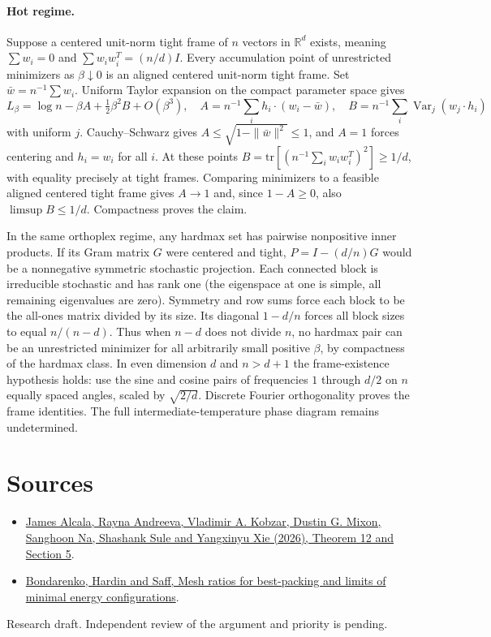 \documentclass[10pt]{article}
\begin{document}
\paragraph{Hot regime.} Suppose a centered unit-norm tight frame of $n$ vectors in $\mathbb R^d$ exists, meaning $\sum w_i=0$ and $\sum w_iw_i^T=(n/d)I$. Every accumulation point of unrestricted minimizers as $\beta\downarrow0$ is an aligned centered unit-norm tight frame. Set $\bar w=n^{-1}\sum w_i$. Uniform Taylor expansion on the compact parameter space gives
\[
 L_\beta=\log n-\beta A+\tfrac12\beta^2 B+O(\beta^3),\quad
 A=n^{-1}\sum_i h_i\cdot(w_i-\bar w),\quad B=n^{-1}\sum_i\operatorname{Var}_{j}(w_j\cdot h_i)
\]
with uniform $j$. Cauchy--Schwarz gives $A\le\sqrt{1-\|\bar w\|^2}\le1$, and $A=1$ forces centering and $h_i=w_i$ for all $i$. At these points $B=\mathrm{tr}[(n^{-1}\sum_i w_iw_i^T)^2]\ge1/d$, with equality precisely at tight frames. Comparing minimizers to a feasible aligned centered tight frame gives $A\to1$ and, since $1-A\ge0$, also $\limsup B\le1/d$. Compactness proves the claim.

In the same orthoplex regime, any hardmax set has pairwise nonpositive inner products. If its Gram matrix $G$ were centered and tight, $P=I-(d/n)G$ would be a nonnegative symmetric stochastic projection. Each connected block is irreducible stochastic and has rank one (the eigenspace at one is simple, all remaining eigenvalues are zero). Symmetry and row sums force each block to be the all-ones matrix divided by its size. Its diagonal $1-d/n$ forces all block sizes to equal $n/(n-d)$. Thus when $n-d$ does not divide $n$, no hardmax pair can be an unrestricted minimizer for all arbitrarily small positive $\beta$, by compactness of the hardmax class. In even dimension $d$ and $n>d+1$ the frame-existence hypothesis holds: use the sine and cosine pairs of frequencies $1$ through $d/2$ on $n$ equally spaced angles, scaled by $\sqrt{2/d}$. Discrete Fourier orthogonality proves the frame identities. The full intermediate-temperature phase diagram remains undetermined.

\section*{Sources}
\begin{itemize}
\item \href{https://arxiv.org/abs/2603.20587}{James Alcala, Rayna Andreeva, Vladimir A. Kobzar, Dustin G. Mixon, Sanghoon Na, Shashank Sule and Yangxinyu Xie (2026), Theorem 12 and Section 5}.
\item \href{https://arxiv.org/abs/1212.6211}{Bondarenko, Hardin and Saff, Mesh ratios for best-packing and limits of minimal energy configurations}.
\end{itemize}
{\small Research draft. Independent review of the argument and priority is pending.}
\end{document}
